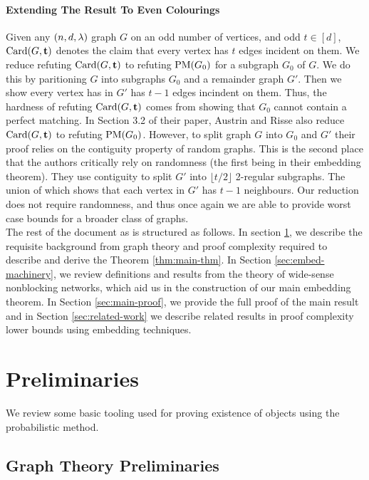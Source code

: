 \documentclass[11pt]{article}
\begin{document}
\paragraph{Extending The Result To Even Colourings}
Given any $(n, d, \lambda)$ graph $G$ on an odd number of vertices, and odd $t\in [d]$, $\text{Card}(G, \mathbf{t})$ denotes the claim that every vertex has $t$ edges incident on them.
We reduce refuting $\text{Card}(G, \mathbf{t})$ to refuting $\text{PM}(G_0)$ for a subgraph $G_0$ of $G$.
We do this by paritioning $G$ into subgraphs $G_0$ and a remainder graph $G'$.
Then we show every vertex has in $G'$ has $t-1$ edges incindent on them.
Thus, the hardness of refuting $\text{Card}(G, \mathbf{t})$ comes from showing that $G_0$ cannot contain a perfect matching.
In Section 3.2 of their paper, Austrin and Risse also reduce $\text{Card}(G, \mathbf{t})$ to refuting $\text{PM}(G_0)$.
However, to split graph $G$ into $G_0$ and $G'$ their proof relies on the contiguity property \citep[See Chapter 23]{frieze2024introduction} of random graphs.
This is the second place that the authors critically rely on randomness (the first being in their embedding theorem).
They use contiguity to split $G'$ into $\lfloor t/2\rfloor$ 2-regular subgraphs.
The union of which shows that each vertex in $G'$ has $t-1$ neighbours.
Our reduction does not require randomness, and thus once again we are able to provide worst case bounds for a broader class of graphs.\\
The rest of the document as is structured as follows. In section \ref{sec:prelims}, we describe the requisite background from graph theory and proof complexity required to describe and derive the Theorem \ref{thm:main-thm}.
In Section \ref{sec:embed-machinery}, we review definitions and results from the theory of wide-sense nonblocking networks, which aid us in the construction of our main embedding theorem.
In Section \ref{sec:main-proof}, we provide the full proof of the main result and in Section \ref{sec:related-work} we describe related results in proof complexity lower bounds using embedding techniques.


\section{Preliminaries}
\label{sec:prelims}

We review some basic tooling used for proving existence of objects using the probabilistic method.




\subsection{Graph Theory Preliminaries}
\label{sec:graph-theory-prelims}
\end{document}
